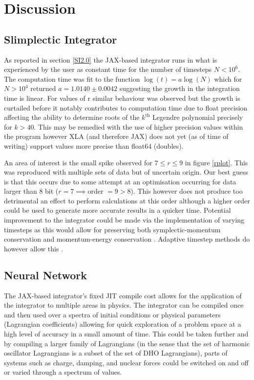 \documentclass[10pt]{iopart}
\begin{document}
\section{Discussion}
\subsection{Slimplectic Integrator}
As reported in section \ref{SI2.0} the JAX-based integrator runs in what is experienced by the user as constant time for the number of timesteps $N<10^6$. The computation time was fit to the function $\log(t)=a\log(N)$ which for $N>10^4$ returned $a = 1.0140\pm0.0042$ suggesting the growth in the integration time is linear. For values of r similar behaviour was observed but the growth is curtailed before it notably contributes to computation time due to float precision affecting the ability to determine roots of the $k^{\textrm{th}}$ Legendre polynomial precisely for $k>40$. This may be remedied with the use of higher precision values within the program however XLA  (and therefore JAX) does not yet (as of time of writing) support values more precise than float64 (doubles). 

An area of interest is the small spike observed for $7\leq r \leq 9$ in figure \ref{rplot}. This was reproduced with multiple sets of data but of uncertain origin. Our best guess is that this occurs due to some attempt at an optimisation occurring for data larger than 8 bit ($r=7\implies$order $=9 > 8$). This however does not produce too detrimental an effect to perform calculations at this order although a higher order could be used to generate more accurate results in a quicker time. 
Potential improvement to the integrator could be made via the implementation of varying timesteps as this would allow for preserving both symplectic-momentum conservation and momentum-energy conservation \cite{Ge}. Adaptive timestep methods do however allow this \cite{Kane}.


\subsection{Neural Network}

The JAX-based integrator's fixed JIT compile cost allows for the application of the integrator to multiple areas in physics. The integrator can be compiled once and then used over a spectra of initial conditions or physical parameters (Lagrangian coefficients) allowing for quick exploration of a problem space at a high level of accuracy in a small amount of time. This could be taken further and by compiling a larger family of Lagrangians (in the sense that the set of harmonic oscillator Lagrangians is a subset of the set of DHO Lagrangians), parts of systems such as charge, damping, and nuclear forces could be switched on and off or varied through a spectrum of values.
\end{document}
